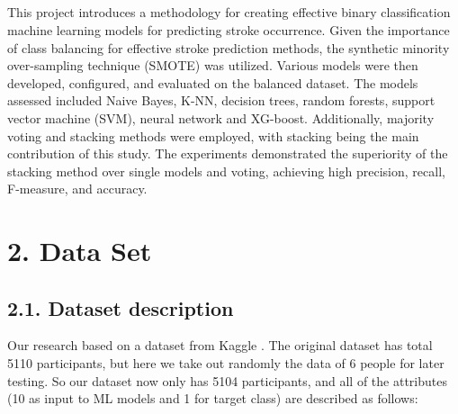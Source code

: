 \documentclass[a4paper]{report}
\begin{document}
	\paragraph{} \Large
	This project introduces a methodology for creating effective binary classification machine learning models for predicting stroke occurrence. Given the importance of class balancing for effective stroke prediction methods, the synthetic minority over-sampling technique (SMOTE) was utilized. Various models were then developed, configured, and evaluated on the balanced dataset. The models assessed included Naive Bayes, K-NN, decision trees, random forests, support vector machine (SVM), neural network and XG-boost. Additionally, majority voting and stacking methods were employed, with stacking being the main contribution of this study. The experiments demonstrated the superiority of the stacking method over single models and voting, achieving high precision, recall, F-measure, and accuracy.
	
	
	
	\chapter*{\huge 2. Data Set}
	
	\section*{\Large 2.1. Dataset description}
	\Large
	Our research based on a dataset from Kaggle \cite{dataset}. The original dataset has total 5110 participants, but here we take out randomly the data of 6 people for later testing. So our dataset now only has 5104 participants, and all of the attributes (10 as input to ML models and 1 for target class) are described as follows: 
	
\end{document}
